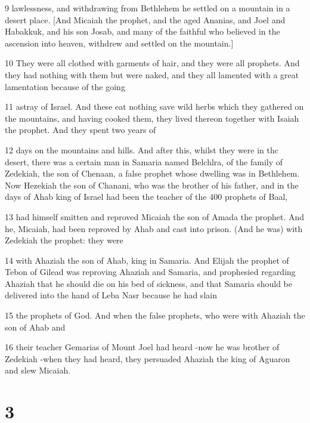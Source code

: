 \par 9 lawlessness, and withdrawing from Bethlehem he settled on a mountain in a desert place. [And Micaiah the prophet, and the aged Ananias, and Joel and Habakkuk, and his son Josab, and many of the faithful who believed in the ascension into heaven, withdrew and settled on the mountain.]

\par 10 They were all clothed with garments of hair, and they were all prophets. And they had nothing with them but were naked, and they all lamented with a great lamentation because of the going

\par 11 astray of Israel. And these eat nothing save wild herbs which they gathered on the mountains, and having cooked them, they lived thereon together with Isaiah the prophet. And they spent two years of

\par 12 days on the mountains and hills. And after this, whilst they were in thc desert, there was a certain man in Samaria named Belchlra, of the family of Zedekiah, the son of Chenaan, a false prophet whose dwelling was in Bethlehem. Now Hezekiah the son of Chanani, who was the brother of his father, and in the days of Ahab king of Israel had been the teacher of the 400 prophets of Baal,

\par 13 had himself smitten and reproved Micaiah the son of Amada the prophet. And he, Micaiah, had been reproved by Ahab and cast into prison. (And he was) with Zedekiah the prophet: they were

\par 14 with Ahaziah the son of Ahab, king in Samaria. And Elijah the prophet of Tebon of Gilead was reproving Ahaziah and Samaria, and prophesied regarding Ahaziah that he should die on his bed of sickness, and that Samaria should be delivered into the hand of Leba Nasr because he had slain

\par 15 the prophets of God. And when the false prophets, who were with Ahaziah the son of Ahab and

\par 16 their teacher Gemarias of Mount Joel had heard -now he was brother of Zedekiah -when they had heard, they persuaded Ahaziah the king of Aguaron and slew Micaiah.

\chapter{3}

